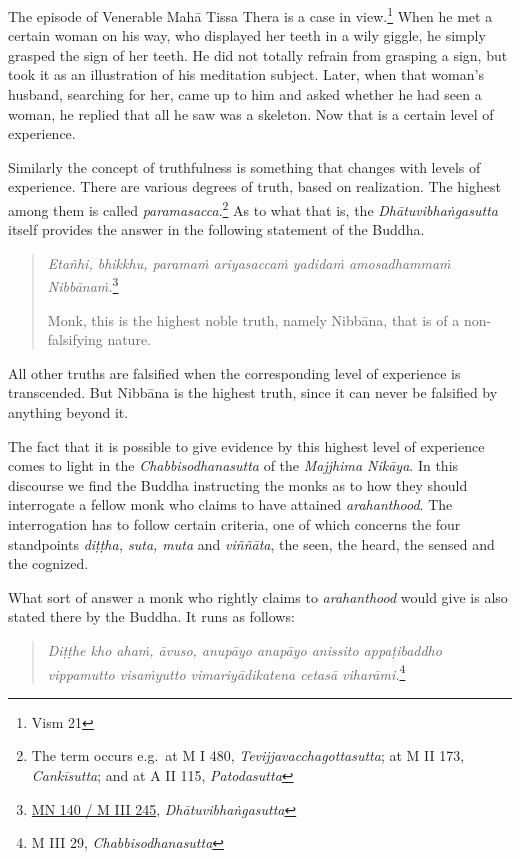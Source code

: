 The episode of Venerable Mahā Tissa Thera is a case in view.\footnote{Vism 21} When he met a certain woman on his way, who displayed her teeth in a wily giggle, he simply grasped the sign of her teeth. He did not totally refrain from grasping a sign, but took it as an illustration of his meditation subject. Later, when that woman's husband, searching for her, came up to him and asked whether he had seen a woman, he replied that all he saw was a skeleton. Now that is a certain level of experience.

Similarly the concept of truthfulness is something that changes with levels of experience. There are various degrees of truth, based on realization. The highest among them is called \emph{paramasacca}.\footnote{The term occurs e.g.~at M I 480, \emph{Tevijjavacchagottasutta}; at M II 173, \emph{Cankīsutta}; and at A II 115, \emph{Patodasutta}} As to what that is, the \emph{Dhātuvibhaṅgasutta} itself provides the answer in the following statement of the Buddha.

\begin{quote}
\emph{Etañhi, bhikkhu, paramaṁ ariyasaccaṁ yadidaṁ amosadhammaṁ Nibbānaṁ.}\footnote{\href{https://suttacentral.net/mn140/pli/ms}{MN 140 / M III 245}, \emph{Dhātuvibhaṅgasutta}}

Monk, this is the highest noble truth, namely Nibbāna, that is of a non-falsifying nature.
\end{quote}

All other truths are falsified when the corresponding level of experience is transcended. But Nibbāna is the highest truth, since it can never be falsified by anything beyond it.

The fact that it is possible to give evidence by this highest level of experience comes to light in the \emph{Chabbisodhanasutta} of the \emph{Majjhima Nikāya}. In this discourse we find the Buddha instructing the monks as to how they should interrogate a fellow monk who claims to have attained \emph{arahanthood}. The interrogation has to follow certain criteria, one of which concerns the four standpoints \emph{diṭṭha, suta, muta} and \emph{viññāta}, the seen, the heard, the sensed and the cognized.

What sort of answer a monk who rightly claims to \emph{arahanthood} would give is also stated there by the Buddha. It runs as follows:

\begin{quote}
\emph{Diṭṭhe kho ahaṁ, āvuso, anupāyo anapāyo anissito appaṭibaddho vippamutto visaṁyutto vimariyādikatena cetasā viharāmi.}\footnote{M III 29, \emph{Chabbisodhanasutta}}
\end{quote}


